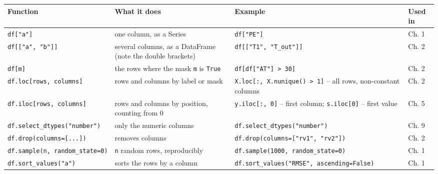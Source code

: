 \documentclass[
  letterpaper,
  DIV=11,
  numbers=noendperiod]{scrreprt}
\begin{document}
\begin{longtable}[]{@{}
  >{\raggedright\arraybackslash}p{}
  >{\raggedright\arraybackslash}p{}
  >{\raggedright\arraybackslash}p{}
  >{\raggedright\arraybackslash}p{}@{}}
\toprule\noalign{}
\begin{minipage}[b]{\linewidth}\raggedright
Function
\end{minipage} & \begin{minipage}[b]{\linewidth}\raggedright
What it does
\end{minipage} & \begin{minipage}[b]{\linewidth}\raggedright
Example
\end{minipage} & \begin{minipage}[b]{\linewidth}\raggedright
Used in
\end{minipage} \\
\midrule\noalign{}
\endhead
\bottomrule\noalign{}
\endlastfoot
\texttt{df{[}"a"{]}} & one column, as a Series & \texttt{df{[}"PE"{]}} &
Ch. 1 \\
\texttt{df{[}{[}"a",\ "b"{]}{]}} & several columns, as a DataFrame (note
the double brackets) & \texttt{df{[}{[}"T1",\ "T\_out"{]}{]}} & Ch. 2 \\
\texttt{df{[}m{]}} & the rows where the mask \texttt{m} is \texttt{True}
& \texttt{df{[}df{[}"AT"{]}\ \textgreater{}\ 30{]}} & Ch. 2 \\
\texttt{df.loc{[}rows,\ columns{]}} & rows and columns by label or mask
& \texttt{X.loc{[}:,\ X.nunique()\ \textgreater{}\ 1{]}} -- all rows,
non-constant columns & Ch. 2 \\
\texttt{df.iloc{[}rows,\ columns{]}} & rows and columns by position,
counting from 0 & \texttt{y.iloc{[}:,\ 0{]}} -- first column;
\texttt{s.iloc{[}0{]}} -- first value & Ch. 5 \\
\texttt{df.select\_dtypes("number")} & only the numeric columns &
\texttt{df.select\_dtypes("number")} & Ch. 9 \\
\texttt{df.drop(columns={[}...{]})} & removes columns &
\texttt{df.drop(columns={[}"rv1",\ "rv2"{]})} & Ch. 2 \\
\texttt{df.sample(n,\ random\_state=0)} & \texttt{n} random rows,
reproducibly & \texttt{df.sample(1000,\ random\_state=0)} & Ch. 1 \\
\texttt{df.sort\_values("a")} & sorts the rows by a column &
\texttt{df.sort\_values("RMSE",\ ascending=False)} & Ch. 1 \\
\end{longtable}
\end{document}
